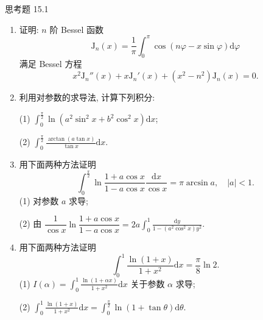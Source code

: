\begin{exblock}{思考题 15.1}
\begin{enumerate}
  \item 证明: $n$ 阶 Bessel 函数
  \[
    \mathrm{J}_{n}(x)=\frac{1}{\pi}\int_{0}^{\pi}\cos(n\varphi-x\sin\varphi)\mathrm{d}\varphi
\]
  满足 Bessel 方程
  \[
    x^{2}\mathrm{J}_{n}''(x)+x\mathrm{J}_{n}'(x)+(x^{2}-n^{2})\mathrm{J}_{n}(x)=0.
\]
  \item 利用对参数的求导法, 计算下列积分:

  (1) $\displaystyle\int_{0}^{\frac{\pi}{2}}\ln(a^{2}\sin^{2}x+b^{2}\cos^{2}x)\mathrm{d}x$;

  (2) $\displaystyle\int_{0}^{\frac{\pi}{2}}\frac{\arctan(a\tan x)}{\tan x}\mathrm{d}x$.
  \item 用下面两种方法证明
  \[
    \int_{0}^{\frac{\pi}{2}}\ln\frac{1+a\cos x}{1-a\cos x}\frac{\mathrm{d}x}{\cos x}=\pi\operatorname{arcsin}a,\quad|a|<1.
\]
  (1) 对参数 $a$ 求导;

  (2) 由 $\dfrac{1}{\cos x}\ln\dfrac{1+a\cos x}{1-a\cos x}=2a\displaystyle\int_{0}^{1}\frac{\mathrm{d}y}{1-(a^{2}\cos^{2}x)y^{2}}$.
  \item 用下面两种方法证明
  \[
    \int_{0}^{1}\frac{\ln(1+x)}{1+x^{2}}\mathrm{d}x=\frac{\pi}{8}\ln2.
\]
  (1) $I(\alpha)=\displaystyle\int_{0}^{1}\frac{\ln(1+\alpha x)}{1+x^{2}}\mathrm{d}x$ 关于参数 $\alpha$ 求导;

  (2) $\displaystyle\int_{0}^{1}\frac{\ln(1+x)}{1+x^{2}}\mathrm{d}x=\int_{0}^{\frac{\pi}{2}}\ln(1+\tan\theta)\mathrm{d}\theta$.
\end{enumerate}
\end{exblock}
